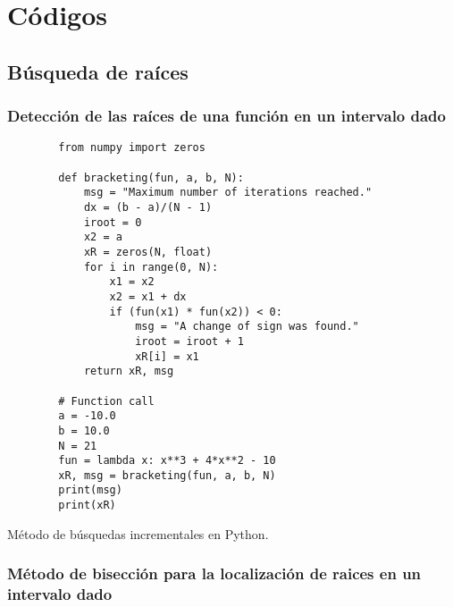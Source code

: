 \graphicspath{{img/algor/}}
\chapter{Códigos}


\section{Búsqueda de raíces}

\subsection{Detección de las raíces de una función en un intervalo dado}


\begin{listing}[H]
    \begin{verbatim}
        from numpy import zeros
        
        def bracketing(fun, a, b, N):
            msg = "Maximum number of iterations reached."
            dx = (b - a)/(N - 1)
            iroot = 0
            x2 = a
            xR = zeros(N, float)
            for i in range(0, N):
                x1 = x2
                x2 = x1 + dx
                if (fun(x1) * fun(x2)) < 0:
                    msg = "A change of sign was found."
                    iroot = iroot + 1
                    xR[i] = x1
            return xR, msg

        # Function call
        a = -10.0
        b = 10.0
        N = 21
        fun = lambda x: x**3 + 4*x**2 - 10
        xR, msg = bracketing(fun, a, b, N)
        print(msg)
        print(xR)
    \end{verbatim}
    \caption{Método de búsquedas incrementales en Python.}
    \label{lst:bracketing}
\end{listing}




\subsection{Método de bisección para la localización de raices en un intervalo dado}

